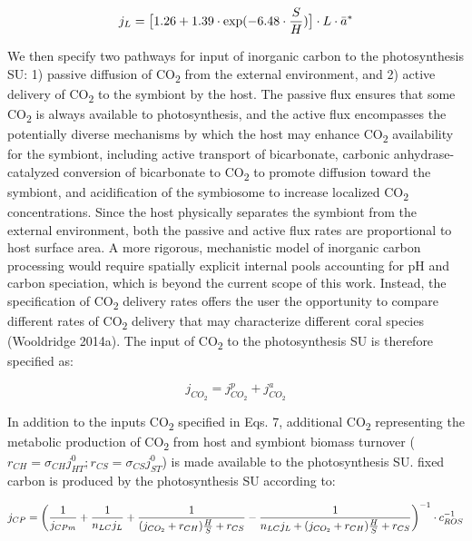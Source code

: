 \documentclass[]{elsarticle} %
\begin{document}
\begin{equation} j_L = \big[1.26 + 1.39 \cdot \exp(-6.48 \cdot {S \over H})\big] \cdot L \cdot \bar{a}^* \end{equation}

We then specify two pathways for input of inorganic carbon to the
photosynthesis SU: 1) passive diffusion of CO\textsubscript{2} from the
external environment, and 2) active delivery of CO\textsubscript{2} to
the symbiont by the host. The passive flux ensures that some
CO\textsubscript{2} is always available to photosynthesis, and the
active flux encompasses the potentially diverse mechanisms by which the
host may enhance CO\textsubscript{2} availability for the symbiont,
including active transport of bicarbonate, carbonic anhydrase-catalyzed
conversion of bicarbonate to CO\textsubscript{2} to promote diffusion
toward the symbiont, and acidification of the symbiosome to increase
localized CO\textsubscript{2} concentrations. Since the host physically
separates the symbiont from the external environment, both the passive
and active flux rates are proportional to host surface area. A more
rigorous, mechanistic model of inorganic carbon processing would require
spatially explicit internal pools accounting for pH and carbon
speciation, which is beyond the current scope of this work. Instead, the
specification of CO\textsubscript{2} delivery rates offers the user the
opportunity to compare different rates of CO\textsubscript{2} delivery
that may characterize different coral species (Wooldridge 2014a). The
input of CO\textsubscript{2} to the photosynthesis SU is therefore
specified as:

\begin{equation} j_{CO_2} = j_{CO_2}^p + j_{CO_2}^a \end{equation}

In addition to the inputs CO\textsubscript{2} specified in Eqs. 7,
additional CO\textsubscript{2} representing the metabolic production of
CO\textsubscript{2} from host and symbiont biomass turnover
(\(r_{CH}=\sigma_{CH}j_{HT}^0; r_{CS}=\sigma_{CS}j_{ST}^0\)) is made
available to the photosynthesis SU. fixed carbon is produced by the
photosynthesis SU according to:

\begin{equation} j_{CP} = \bigg({1 \over j_{CPm}} + {1 \over {n_{LC} j_L }} + {1 \over {(j_{CO_2} + r_{CH}){H \over S} + r_{CS}}} - {1 \over {n_{LC} j_L + (j_{CO_2} + r_{CH}){H \over S} + r_{CS}}}\bigg)^{-1} \cdot c_{ROS}^{-1} \end{equation}
\end{document}
